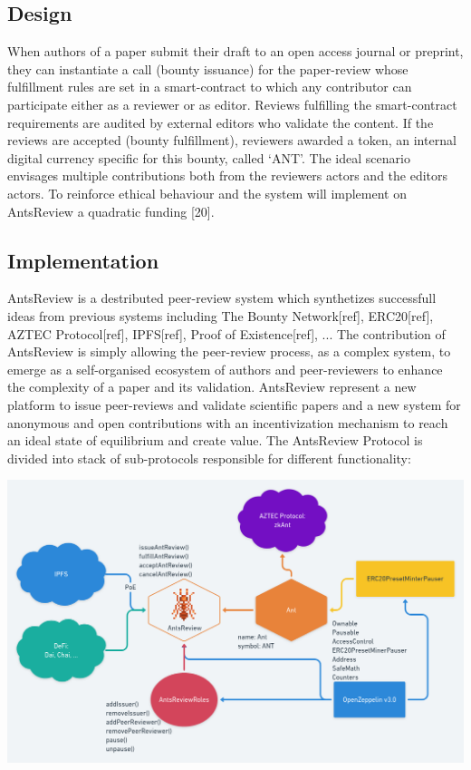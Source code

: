 \documentclass[runningheads]{llncs}
\begin{document}
\subsection{Design}
When authors of a paper submit their draft to an open access journal or preprint, they can instantiate a call (bounty issuance) for the paper-review whose fulfillment rules are set in a smart-contract to which any contributor can participate either as a reviewer or as editor. Reviews fulfilling the smart-contract requirements are audited by external editors who validate the content. If the reviews are accepted (bounty fulfillment), reviewers awarded a token, an internal digital currency specific for this bounty, called ‘ANT’. The ideal scenario envisages multiple contributions both from the reviewers actors and the editors actors. To reinforce ethical behaviour and the system will implement on AntsReview a quadratic funding [20].

\subsection{Implementation}
AntsReview is a destributed peer-review system which synthetizes successfull ideas from previous systems including The Bounty Network[ref], ERC20[ref], AZTEC Protocol[ref], IPFS[ref], Proof of Existence[ref], ...
\newline The contribution of AntsReview is simply allowing the peer-review process, as a complex system, to emerge as a self-organised ecosystem of authors and peer-reviewers to enhance the complexity of a paper and its validation.
\newline AntsReview represent a new platform to issue peer-reviews and validate scientific papers and a new system for anonymous and open contributions with an incentivization mechanism to reach an ideal state of equilibrium and create value.
\newline The AntsReview Protocol is divided into stack of sub-protocols responsible for different functionality:

\includegraphics[scale=0.28]{AntsReview}
\end{document}
